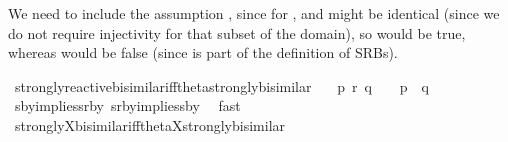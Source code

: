 \begin{isabellebody}
\begin{isamarkuptext}
We need to include the assumption , since for ,  and  might be identical (since we do not require injectivity for that subset of the domain), so  would be true, whereas  would be false (since  is part of the definition of SRBs).%
\end{isamarkuptext}\isamarkuptrue%
%
\isadelimdocument
%
\endisadelimdocument
%
\isatagdocument
%
\isamarkuptrue%
%
\endisatagdocument
{\isafolddocument}%
%
\isadelimdocument
%
\endisadelimdocument
%
\isadelimvisible
%
\endisadelimvisible
%
\isatagvisible
{}\isamarkupfalse%
\ strongly{\isacharunderscore}{\kern0pt}reactive{\isacharunderscore}{\kern0pt}bisimilar{\isacharunderscore}{\kern0pt}iff{\isacharunderscore}{\kern0pt}theta{\isacharunderscore}{\kern0pt}strongly{\isacharunderscore}{\kern0pt}bisimilar{\isacharcolon}{\kern0pt}\isanewline
\ \ \ {\isacartoucheopen}p\ {\isasymleftrightarrow}\isactrlsub r\ q\ \ {\isasymLongleftrightarrow}\ \ {\isasymtheta}{\isacharparenleft}{\kern0pt}p{\isacharparenright}{\kern0pt}\ {\isasymleftrightarrow}\ {\isasymtheta}{\isacharparenleft}{\kern0pt}q{\isacharparenright}{\kern0pt}{\isacartoucheclose}\isanewline
\ \ \isamarkupfalse%
\ sby{\isacharunderscore}{\kern0pt}implies{\isacharunderscore}{\kern0pt}srby\ srby{\isacharunderscore}{\kern0pt}implies{\isacharunderscore}{\kern0pt}sby\ \isamarkupfalse%
\ fast\isanewline
\isanewline
{}\isamarkupfalse%
\ strongly{\isacharunderscore}{\kern0pt}X{\isacharunderscore}{\kern0pt}bisimilar{\isacharunderscore}{\kern0pt}iff{\isacharunderscore}{\kern0pt}theta{\isacharunderscore}{\kern0pt}X{\isacharunderscore}{\kern0pt}strongly{\isacharunderscore}{\kern0pt}bisimilar{\isacharcolon}{\kern0pt}\isanewline

\end{isabellebody}
